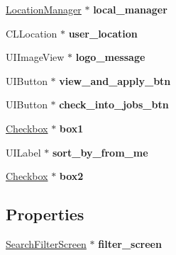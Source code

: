 \begin{DoxyCompactItemize}
\item 
\hypertarget{interface_menu_ab16bc359995509760f564ff509c926f5}{
\hyperlink{interface_location_manager}{\-Location\-Manager} $\ast$ {\bfseries local\-\_\-manager}}
\label{interface_menu_ab16bc359995509760f564ff509c926f5}

\item 
\hypertarget{interface_menu_ac2b3b23fe84217d3df51d1e51a7548ae}{
\-C\-L\-Location $\ast$ {\bfseries user\-\_\-location}}
\label{interface_menu_ac2b3b23fe84217d3df51d1e51a7548ae}

\item 
\hypertarget{interface_menu_abef1b0d544ee6233da10c5f8ce8f7598}{
\-U\-I\-Image\-View $\ast$ {\bfseries logo\-\_\-message}}
\label{interface_menu_abef1b0d544ee6233da10c5f8ce8f7598}

\item 
\hypertarget{interface_menu_ad103b1f8fcf1e3b2e8ac0c1d3097e9c6}{
\-U\-I\-Button $\ast$ {\bfseries view\-\_\-and\-\_\-apply\-\_\-btn}}
\label{interface_menu_ad103b1f8fcf1e3b2e8ac0c1d3097e9c6}

\item 
\hypertarget{interface_menu_aa06b714927aede11d893a59d86fc7200}{
\-U\-I\-Button $\ast$ {\bfseries check\-\_\-into\-\_\-jobs\-\_\-btn}}
\label{interface_menu_aa06b714927aede11d893a59d86fc7200}

\item 
\hypertarget{interface_menu_a1e1b70cd5c6506f0a769e512491a22e5}{
\hyperlink{interface_checkbox}{\-Checkbox} $\ast$ {\bfseries box1}}
\label{interface_menu_a1e1b70cd5c6506f0a769e512491a22e5}

\item 
\hypertarget{interface_menu_ace763b1df5ef363d2d1814ccee797405}{
\-U\-I\-Label $\ast$ {\bfseries sort\-\_\-by\-\_\-from\-\_\-me}}
\label{interface_menu_ace763b1df5ef363d2d1814ccee797405}

\item 
\hypertarget{interface_menu_ade3f70834c134185e497b8a564f282f1}{
\hyperlink{interface_checkbox}{\-Checkbox} $\ast$ {\bfseries box2}}
\label{interface_menu_ade3f70834c134185e497b8a564f282f1}

\end{DoxyCompactItemize}
\subsection*{\-Properties}
\begin{DoxyCompactItemize}
\item 
\hypertarget{interface_menu_a83a0845862601879dedae070a5b0d632}{
\hyperlink{interface_search_filter_screen}{\-Search\-Filter\-Screen} $\ast$ {\bfseries filter\-\_\-screen}}
\label{interface_menu_a83a0845862601879dedae070a5b0d632}

\end{DoxyCompactItemize}


